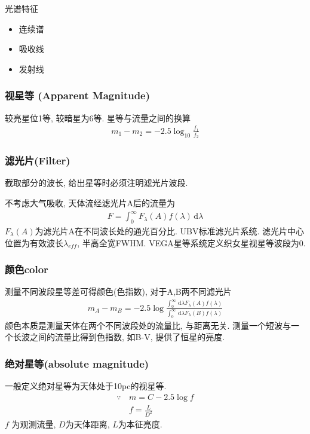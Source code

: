 光谱特征
\begin{itemize}
    \item 连续谱
    \item 吸收线
    \item 发射线
\end{itemize}

\subsubsection{视星等 (Apparent Magnitude)}
较亮星位1等, 较暗星为6等. 星等与流量之间的换算
\begin{align*}
    m_1-m_2=-2.5\log_{10} \frac{f_1}{f_2}
\end{align*}

\subsubsection{滤光片(Filter)}
截取部分的波长, 给出星等时必须注明滤光片波段. 

不考虑大气吸收, 天体流经滤光片A后的流量为
\begin{align*}
    F=\int_0^{\infty} F_{\lambda}(A) f(\lambda)\, \mathrm{d}\lambda
\end{align*}
$F_{\lambda}(A)$为滤光片A在不同波长处的通光百分比. UBV标准滤光片系统. 滤光片中心位置为有效波长$\lambda_{eff}$, 半高全宽FWHM. VEGA星等系统定义织女星视星等波段为0. 

\subsubsection{颜色color}
测量不同波段星等差可得颜色(色指数), 对于A,B两不同滤光片
\begin{align*}
    m_A-m_B=-2.5\log \frac{\int_0^{\infty} \, \mathrm{d}\lambda F_{\lambda}(A) f(\lambda)}{\int_0^{\infty} \, \mathrm{d}\lambda F_{\lambda}(B) f(\lambda)}
\end{align*}
颜色本质是测量天体在两个不同波段处的流量比, 与距离无关. 测量一个短波与一个长波之间的流量比得到色指数, 如B-V, 提供了恒星的亮度. 

\subsubsection{绝对星等(absolute magnitude)}
一般定义绝对星等为天体处于10pc的视星等. 
\begin{align*}
    \because \, & m=C-2.5\log f\\
    & f=\frac{L}{D^2}
\end{align*}
$f$ 为观测流量, $D$为天体距离, $L$为本征亮度. 


